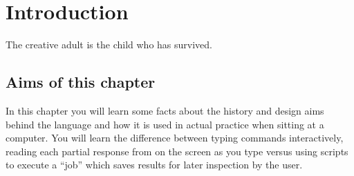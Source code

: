 \documentclass[krantz2]{krantz}\usepackage{knitr}%
\begin{document}

\frontmatter

\maketitle


\setcounter{page}{7} %
\tableofcontents
%

\listoffigures
\listoftables
%
%

\mainmatter







\chapter{Introduction}\label{chap:R:introduction}

\begin{VF}
The creative adult is the child who has survived.

\end{VF}


\section{Aims of this chapter}

In this chapter you will learn some facts about the history and design aims behind the \Rlang language and how it is used in actual practice when sitting at a computer. You will learn the difference between typing commands interactively, reading each partial response from \Rlang on the screen as you type versus using scripts to execute a ``job'' which saves results for later inspection by the user.
\end{document}
